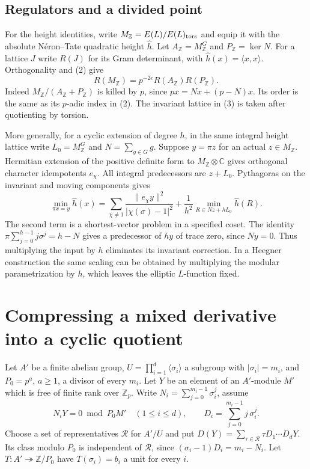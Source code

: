 \documentclass[11pt]{article}
\newcommand{\Z}{\mathbb Z}
\begin{document}
\subsection*{Regulators and a divided point}
For the height identities, write $M_{\Z}=E(L)/E(L)_{\rm tors}$
and equip it with the absolute N\'eron--Tate quadratic height
$\hat h$. Let $A_{\Z}=M_{\Z}^{G}$ and $P_{\Z}=\ker N$.
For a lattice $J$ write $R(J)$ for its Gram determinant, with
$\hat h(x)=\langle x,x\rangle$. Orthogonality and (2) give
\[
 R(M_{\Z})=p^{-2e} R(A_{\Z})R(P_{\Z}).
 \tag{3}
\]
Indeed $M_{\Z}/(A_{\Z}+P_{\Z})$ is killed by $p$, since
$p x=Nx+(p-N)x$. Its order is the same as its $p$-adic index in (2).
The invariant lattice in (3) is taken after quotienting by torsion.

More generally, for a cyclic extension of degree $h$, in the same
integral height lattice write $L_0=M_{\Z}^{G}$ and $N=\sum_{g\in G}g$.
Suppose $y=\pi z$ for an actual $z\in M_{\Z}$. Hermitian extension
of the positive definite form to $M_{\Z}\otimes\mathbb C$ gives
orthogonal character idempotents $e_\chi$. All integral predecessors
are $z+L_0$. Pythagoras on the invariant and moving components gives
\[
 \min_{\pi x=y}\hat h(x)=
 \sum_{\chi\ne1}\frac{\|e_\chi y\|^2}{|\chi(\sigma)-1|^2}
 +\frac1{h^2}\min_{R\in Nz+hL_0}\hat h(R).
 \tag{4}
\]
The second term is a shortest-vector problem in a specified coset.
The identity
$\pi\sum_{j=0}^{h-1}j\sigma^j=h-N$ gives a predecessor of $hy$
of trace zero, since $Ny=0$. Thus multiplying the input by $h$
eliminates its invariant correction. In a Heegner construction the
same scaling can be obtained by multiplying the modular
parametrization by $h$, which leaves the elliptic $L$-function fixed.

\section{Compressing a mixed derivative into a cyclic quotient}
Let $A'$ be a finite abelian group, $U=\prod_{i=1}^d
\langle\sigma_i\rangle$ a subgroup with $|\sigma_i|=m_i$, and
$P_0=p^a$, $a\ge1$, a divisor of every $m_i$. Let $Y$ be an element
of an $A'$-module $M'$ which is free of finite rank over $\Z_p$.
Write $N_i=\sum_{j=0}^{m_i-1}\sigma_i^j$, assume
\[
 N_iY=0\bmod P_0M'\quad(1\le i\le d),
 \qquad
 D_i=\sum_{j=0}^{m_i-1} j\,\sigma_i^j.
\]
Choose a set of representatives $\mathcal R$ for $A'/U$
and put $D(Y)=\sum_{\tau\in\mathcal R}\tau D_1\cdots D_dY$.
Its class modulo $P_0$ is independent of $\mathcal R$, since
$(\sigma_i-1)D_i=m_i-N_i$.
Let $T:A'\twoheadrightarrow\Z/P_0$ have $T(\sigma_i)=b_i$
a unit for every $i$.
\end{document}
